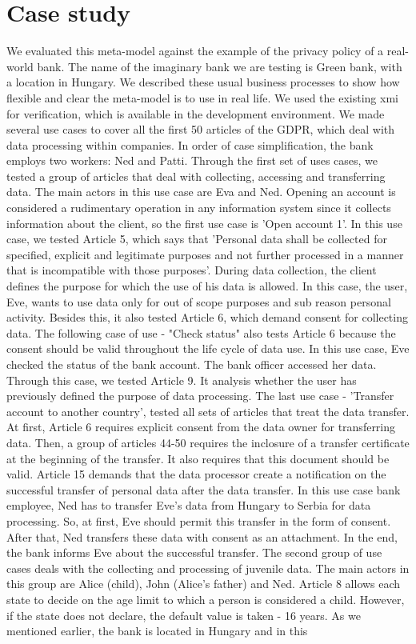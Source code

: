 \documentclass[11pt,english]{article}
\begin{document}
\section{Case study}
We evaluated this meta-model against the example of the privacy policy of a real-world bank. The name of the imaginary bank we are testing is Green bank, with a location in Hungary. We described these usual business processes to show how flexible and clear the meta-model is to use in real life. We used the existing xmi for verification, which is available in the development environment. We made several use cases to cover all the first 50 articles of the GDPR, which deal with data processing within companies. In order of case simplification, the bank employs two workers: Ned and Patti. \newline Through the first set of uses cases, we tested a group of articles that deal with collecting, accessing and transferring data. The main actors in this use case are Eva and Ned. Opening an account is considered a rudimentary operation in any information system since it collects information about the client, so the first use case is 'Open account 1'. In this use case, we tested Article 5, which says that 'Personal data shall be collected for specified, explicit and legitimate purposes and not further processed in a manner that is incompatible with those purposes'. During data collection, the client defines the purpose for which the use of his data is allowed. In this case, the user, Eve, wants to use data only for out of scope purposes and sub reason personal activity. Besides this, it also tested Article 6, which demand consent for collecting data. The following case of use - "Check status" also tests Article 6 because the consent should be valid throughout the life cycle of data use. In this use case, Eve checked the status of the bank account. The bank officer accessed her data. Through this case, we tested Article 9. It analysis whether the user has previously defined the purpose of data processing. The last use case - 'Transfer account to another country', tested all sets of articles that treat the data transfer. At first, Article 6 requires explicit consent from the data owner for transferring data. Then, a group of articles 44-50 requires the inclosure of a transfer certificate at the beginning of the transfer. It also requires that this document should be valid. Article 15 demands that the data processor create a notification on the successful transfer of personal data after the data transfer. In this use case bank employee, Ned has to transfer Eve's data from Hungary to Serbia for data processing. So, at first, Eve should permit this transfer in the form of consent. After that, Ned transfers these data with consent as an attachment. In the end, the bank informs Eve about the successful transfer. \newline The second group of use cases deals with the collecting and processing of juvenile data. The main actors in this group are Alice (child), John (Alice's father) and Ned. Article 8 allows each state to decide on the age limit to which a person is considered a child. However, if the state does not declare, the default value is taken - 16 years. As we mentioned earlier, the bank is located in Hungary and in this 
\end{document}
